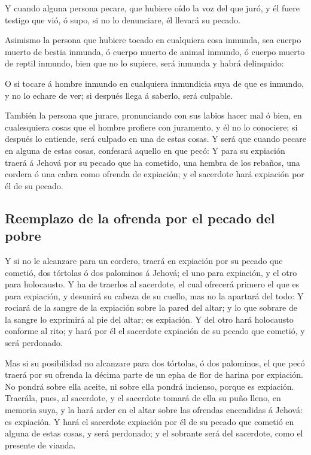  Y cuando alguna persona pecare, que hubiere oído la voz
del que juró, y él fuere testigo que vió, ó supo, si no lo denunciare,
él llevará su pecado.

 Asimismo la persona que hubiere tocado en cualquiera cosa
inmunda, sea cuerpo muerto de bestia inmunda, ó cuerpo muerto de animal
inmundo, ó cuerpo muerto de reptil inmundo, bien que no lo supiere, será
inmunda y habrá delinquido:

 O si tocare á hombre inmundo en cualquiera inmundicia
suya de que es inmundo, y no lo echare de ver; si después llega á
saberlo, será culpable.

 También la persona que jurare, pronunciando con sus
labios hacer mal ó bien, en cualesquiera cosas que el hombre profiere
con juramento, y él no lo conociere; si después lo entiende, será
culpado en una de estas cosas.  Y será que cuando pecare
en alguna de estas cosas, confesará aquello en que pecó: 
Y para su expiación traerá á Jehová por su pecado que ha cometido, una
hembra de los rebaños, una cordera ó una cabra como ofrenda de
expiación; y el sacerdote hará expiación por él de su pecado.

\hypertarget{reemplazo-de-la-ofrenda-por-el-pecado-del-pobre}{%
\subsection{Reemplazo de la ofrenda por el pecado del
pobre}\label{reemplazo-de-la-ofrenda-por-el-pecado-del-pobre}}

 Y si no le alcanzare para un cordero, traerá en expiación
por su pecado que cometió, dos tórtolas ó dos palominos á Jehová; el uno
para expiación, y el otro para holocausto.  Y ha de
traerlos al sacerdote, el cual ofrecerá primero el que es para
expiación, y desunirá su cabeza de su cuello, mas no la apartará del
todo:  Y rociará de la sangre de la expiación sobre la
pared del altar; y lo que sobrare de la sangre lo exprimirá al pie del
altar; es expiación.  Y del otro hará holocausto conforme
al rito; y hará por él el sacerdote expiación de su pecado que cometió,
y será perdonado.

 Mas si su posibilidad no alcanzare para dos tórtolas, ó
dos palominos, el que pecó traerá por su ofrenda la décima parte de un
epha de flor de harina por expiación. No pondrá sobre ella aceite, ni
sobre ella pondrá incienso, porque es expiación. 
Traerála, pues, al sacerdote, y el sacerdote tomará de ella su puño
lleno, en memoria suya, y la hará arder en el altar sobre las ofrendas
encendidas á Jehová: es expiación.  Y hará el sacerdote
expiación por él de su pecado que cometió en alguna de estas cosas, y
será perdonado; y el sobrante será del sacerdote, como el presente de
vianda.

